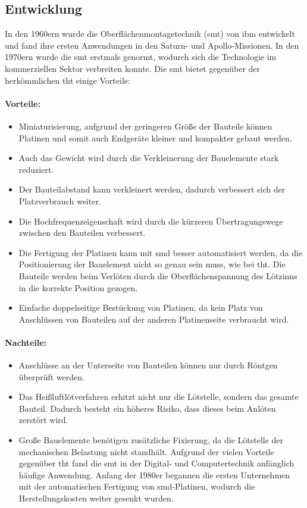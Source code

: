 \subsection{Entwicklung}
In den 1960ern wurde die Oberflächenmontagetechnik (\ac{smt}) von \ac{ibm} entwickelt und fand ihre ersten Anwendungen in den Saturn- und Apollo-Missionen.
In den 1970ern wurde die \ac{smt} erstmals genormt, wodurch sich die Technologie im kommerziellen Sektor verbreiten konnte.
Die \ac{smt} bietet gegenüber der herkömmlichen \ac{tht} einige Vorteile:
\paragraph{Vorteile:}
\begin{itemize}
	\item Miniaturisierung, aufgrund der geringeren Größe der Bauteile können Platinen und somit auch Endgeräte kleiner und kompakter gebaut werden.
	\item Auch das Gewicht wird durch die Verkleinerung der Bauelemente stark reduziert.
	\item Der Bauteilabstand kann verkleinert werden, dadurch verbessert sich der Platzverbrauch weiter.
	\item Die Hochfrequenzeigenschaft wird durch die kürzeren Übertragungswege zwischen den Bauteilen verbessert.
	\item Die Fertigung der Platinen kann mit \ac{smd} besser automatisiert werden, da die Positionierung der Bauelement nicht so genau sein muss, wie bei \ac{tht}.
	Die Bauteile werden beim Verlöten durch die Oberflächenspannung des Lötzinns in die korrekte Position gezogen.
	\item Einfache doppelseitige Bestückung von Platinen, da kein Platz von Anschlüssen von Bauteilen auf der anderen Platinenseite verbraucht wird.
\end{itemize}

\paragraph{Nachteile:}
\begin{itemize}
	\item Anschlüsse an der Unterseite von Bauteilen können nur durch Röntgen überprüft werden.
	\item Das Heißluftlötverfahren erhitzt nicht nur die Lötstelle, sondern das gesamte Bauteil.
 	Dadurch besteht ein höheres Risiko, dass dieses beim Anlöten zerstört wird.
 	\item Große Bauelemente benötigen zusätzliche Fixierung, da die Lötstelle der mechanischen Belastung nicht standhält.
	Aufgrund der vielen Vorteile gegenüber \ac{tht} fand die \ac{smt} in der Digital- und Computertechnik anfänglich häufige Anwendung.
	Anfang der 1980er begannen die ersten Unternehmen mit der automatischen Fertigung von \ac{smd}-Platinen, wodurch die Herstellungskosten weiter gesenkt wurden.	
\end{itemize}

